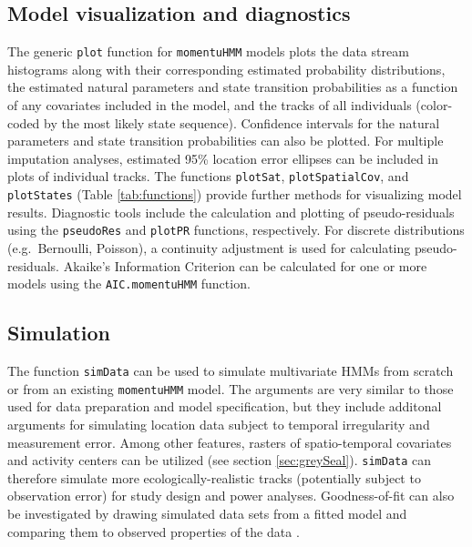 \documentclass[12pt]{article}\usepackage[]{graphicx}\usepackage[]{color}
\begin{document}
\subsection{Model visualization and diagnostics}
The generic \verb|plot| function for \verb|momentuHMM| models plots the data stream histograms along with their corresponding estimated probability distributions, the estimated natural parameters and state transition probabilities as a function of any covariates included in the model, and the tracks of all individuals (color-coded by the most likely state sequence). %
Confidence intervals for the natural parameters and state transition probabilities can also be plotted. %
For multiple imputation analyses, estimated 95\% location error ellipses can be included in plots of individual tracks. The functions \verb|plotSat|, \verb|plotSpatialCov|, and \verb|plotStates| (Table \ref{tab:functions}) provide further methods for visualizing model results. Diagnostic tools include the calculation and plotting of pseudo-residuals \citep{ZucchiniEtAl2016} using the \verb|pseudoRes| and \verb|plotPR| functions, respectively. For discrete distributions (e.g.\ Bernoulli, Poisson), a continuity adjustment is used for calculating pseudo-residuals. Akaike's Information Criterion can be calculated for one or more models using the \verb|AIC.momentuHMM| function.

\subsection{Simulation}
The function \verb|simData| can be used to simulate multivariate HMMs from scratch or from an existing \verb|momentuHMM| model. The arguments are very similar to those used for data preparation and model specification, but they include additonal arguments for simulating location data subject to temporal irregularity and measurement error. Among other features, rasters of spatio-temporal covariates and activity centers can be utilized (see section \ref{sec:greySeal}). \verb|simData| can therefore simulate more ecologically-realistic tracks (potentially subject to observation error) for study design and power analyses. Goodness-of-fit can also be investigated by drawing simulated data sets from a fitted model and comparing them to observed properties of the data \citep{MoralesEtAl2004}.
  
\end{document}
